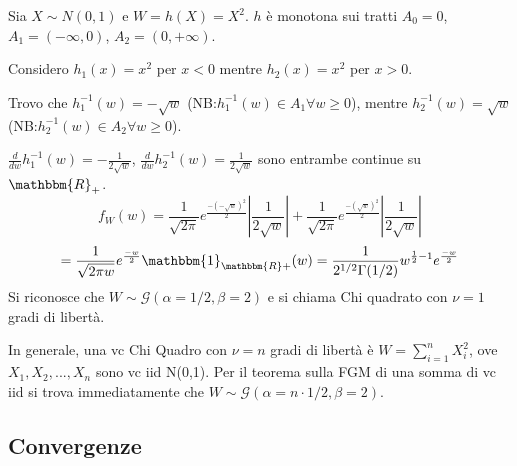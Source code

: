 \noindent Sia $X \sim N(0,1)$ e $W=h(X)=X^2$. $h$ è monotona sui tratti $A_0={0}$, $A_1=(-\infty,0)$, $A_2=(0,+\infty)$. 

\noindent Considero $h_1(x)=x^2$ per $x<0$ mentre $h_2(x)=x^2$ per $x>0$.

\noindent Trovo che $h_1^{-1}(w)=-\sqrt{w}$ (NB:$h_1^{-1}(w)\in A_1 \forall w \geq 0$), mentre $h_2^{-1}(w)=\sqrt{w}$ (NB:$h_2^{-1}(w)\in A_2 \forall w \geq 0$).
 
\noindent $\frac{d}{dw} h_1^{-1}(w)=-\frac{1}{2\sqrt{w}}$, $\frac{d}{dw} h_2^{-1}(w)=\frac{1}{2\sqrt{w}}$ sono entrambe continue su $\mathbbm{R}_+$.
$$f_W(w)=\frac{1}{\sqrt{2\pi}}e^{\frac{-(-\sqrt{w})^2 }{2}}\left|\frac{1}{2\sqrt{w}}\right|+\frac{1}{\sqrt{2\pi}}e^{\frac{-(\sqrt{w})^2 }{2}}\left|\frac{1}{2\sqrt{w}}\right|$$ 
$$=\frac{1}{\sqrt{2\pi w}}
e^{\frac{-w}{2}}\mathbbm{1}_{\mathbbm{R}+}
(w)=\frac{1}{2^{1/2}\Gamma(1/2)}
w^{\frac{1}{2}-1}e^{\frac{-w}{2}}$$
Si riconosce che $W \sim \mathcal{G}(\alpha=1/2,\beta=2)$ e si chiama Chi quadrato con $\nu=1$ gradi di libertà.

In generale, una vc Chi Quadro con $\nu=n$ gradi di libertà è $W=\sum_{i=1}^n X_i^2$, ove $X_1,X_2,...,X_n$ sono vc iid N(0,1). Per il teorema sulla FGM di una somma di vc iid si trova immediatamente che $W \sim \mathcal{G}(\alpha=n \cdot 1/2,\beta=2)$.
\subsection{Convergenze}
